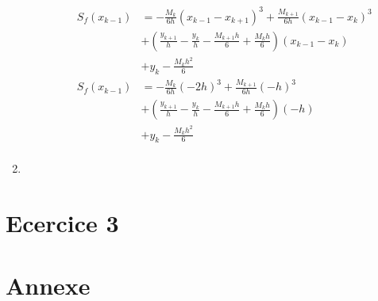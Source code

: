 \documentclass{article}
\begin{document}
\begin{enumerate}
\begin{enumerate}
    \begin{equation*}
      \begin{split}
        S_f(x_{k - 1}) & = - \frac{M_k}{6h} (x_{k - 1} - x_{k + 1})^3 + 
        \frac{M_{k + 1}}{6h} (x_{k - 1} - x_k)^3 \\
        & + \left( \frac{y_{k + 1}}{h} - \frac{y_k}{h} - \frac{M_{k
            + 1} h}{6} + \frac{M_k h}{6} \right) (x_{k - 1} - x_k) \\
        & + y_k - \frac{M_k h^2}{6} \\
        S_f(x_{k - 1}) & = - \frac{M_k}{6h} (- 2h)^3 + 
        \frac{M_{k + 1}}{6h} (-h)^3 \\
        & + \left( \frac{y_{k + 1}}{h} - \frac{y_k}{h} - \frac{M_{k
            + 1} h}{6} + \frac{M_k h}{6} \right) (-h) \\
        & + y_k - \frac{M_k h^2}{6} \\
      \end{split}
    \end{equation*}

  \end{enumerate}

\item 
  
\end{enumerate}

\newpage

\section*{Ecercice 3}

\newpage

\section*{Annexe}
\end{document}
